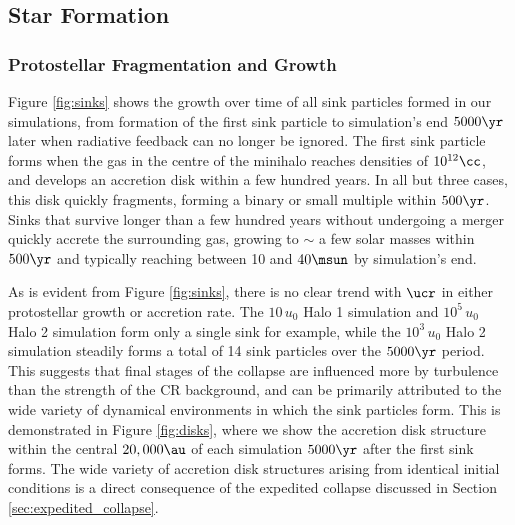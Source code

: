 \subsection{Star Formation}
\subsubsection{Protostellar Fragmentation and Growth}
\label{subsec:sink_formation}

Figure \ref{fig:sinks} shows the growth over time of all sink particles formed in our simulations, from formation of the first sink particle to simulation's end $5000\yr$ later when radiative feedback can no longer be ignored. 
The first sink particle forms when the gas in the centre of the minihalo reaches densities of $10^{12}\cc$, and develops an accretion disk within a few hundred years. 
In all but three cases, this disk quickly fragments, forming a binary or small multiple within $500\yr$. 
Sinks that survive longer than a few hundred years without undergoing a merger quickly accrete the surrounding gas, growing to $\sim$ a few solar masses within $500\yr$ and typically reaching between 10 and $40\msun$ by simulation's end.

As is evident from Figure \ref{fig:sinks}, there is no clear trend with $\ucr$ in either protostellar growth or accretion rate.
The $10\,u_0$ Halo 1 simulation and $10^5\,u_0$ Halo 2 simulation form only a single sink for example, while the $10^3\,u_0$ Halo 2 simulation steadily forms a total of 14 sink particles over the $5000\yr$ period.
This suggests that final stages of the collapse are influenced more by turbulence than the strength of the CR background, and can be primarily attributed to the wide variety of dynamical environments in which the sink particles form.
This is demonstrated in Figure \ref{fig:disks}, where we show the accretion disk structure within the central $20,000\au$ of each simulation $5000\yr$ after the first sink forms.
The wide variety of accretion disk structures arising from identical initial conditions is a direct consequence of the expedited collapse discussed in Section \ref{sec:expedited_collapse}. 